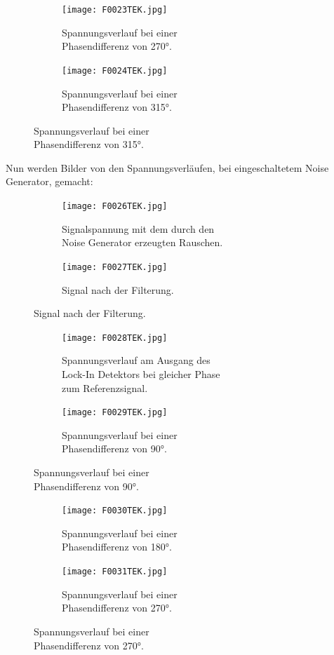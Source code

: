 \documentclass[
  bibliography=totoc,     %
  captions=tableheading,  %
  titlepage=firstiscover, %
]{scrartcl}
\begin{document}
\begin{figure}[htb]
  \centering
  \begin{subfigure}{0.48\textwidth}
    \centering
    \texttt{[image: F0023TEK.jpg]}
    \caption{Spannungsverlauf bei einer\\ Phasendifferenz von 270°.}
    \label{fig:13}
    \qquad
  \end{subfigure}
  \begin{subfigure}{0.48\textwidth}
    \centering
    \texttt{[image: F0024TEK.jpg]}
    \caption{Spannungsverlauf bei einer\\ Phasendifferenz von 315°.}
    \label{fig:14}
    \qquad
  \end{subfigure}
\end{figure}
\clearpage
Nun werden Bilder von den Spannungsverläufen, bei eingeschaltetem Noise Generator, gemacht:
\begin{figure}[htb]
  \centering
  \begin{subfigure}{0.48\textwidth}
    \centering
    \texttt{[image: F0026TEK.jpg]}
    \caption{Signalspannung mit dem durch den\\ Noise Generator erzeugten Rauschen.}
    \label{fig:15}
    \qquad
  \end{subfigure}
  \begin{subfigure}{0.48\textwidth}
    \centering
    \texttt{[image: F0027TEK.jpg]}
    \caption{Signal nach der Filterung.}
    \label{fig:16}
    \qquad
  \end{subfigure}
\end{figure}
\begin{figure}[htb]
  \centering
  \begin{subfigure}{0.48\textwidth}
    \centering
    \texttt{[image: F0028TEK.jpg]}
    \caption{Spannungsverlauf am Ausgang des\\ Lock-In Detektors bei gleicher Phase\\ zum Referenzsignal.}
    \label{fig:17}
    \qquad
  \end{subfigure}
  \begin{subfigure}{0.48\textwidth}
    \centering
    \texttt{[image: F0029TEK.jpg]}
    \caption{Spannungsverlauf bei einer\\ Phasendifferenz von 90°.}
    \label{fig:18}
    \qquad
  \end{subfigure}
\end{figure}
\begin{figure}[htb]
  \centering
  \begin{subfigure}{0.48\textwidth}
    \centering
    \texttt{[image: F0030TEK.jpg]}
    \caption{Spannungsverlauf bei einer\\ Phasendifferenz von 180°.}
    \label{fig:19}
    \qquad
  \end{subfigure}
  \begin{subfigure}{0.48\textwidth}
    \centering
    \texttt{[image: F0031TEK.jpg]}
    \caption{Spannungsverlauf bei einer\\ Phasendifferenz von 270°.}
    \label{fig:20}
    \qquad
  \end{subfigure}
\end{figure}
\end{document}
